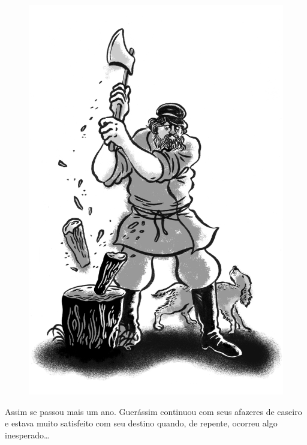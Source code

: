 \begin{figure}%
\vspace*{-1.8cm}
\hspace*{-2.15cm}\includegraphics{./imgs/cena3.jpg}
\end{figure}

Assim se passou mais um ano. Guerássim continuou com seus afazeres de
caseiro e estava muito satisfeito com seu destino quando, de repente,
ocorreu algo inesperado\ldots{}

